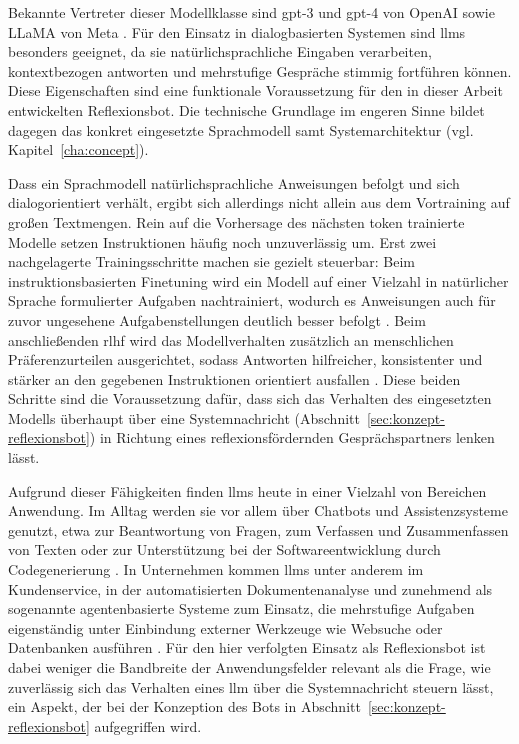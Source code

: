 Bekannte Vertreter dieser Modellklasse sind \acrshort{gpt}-3 und \acrshort{gpt}-4 von OpenAI sowie LLaMA von Meta \cite{zhaoSurveyLargeLanguageModels2023}.
Für den Einsatz in dialogbasierten Systemen sind \glspl{llm} besonders geeignet, da sie natürlichsprachliche Eingaben
verarbeiten, kontextbezogen antworten und mehrstufige Gespräche stimmig fortführen können.
Diese Eigenschaften sind eine funktionale Voraussetzung für den in dieser Arbeit entwickelten
Reflexionsbot. Die technische Grundlage im engeren Sinne bildet dagegen das konkret eingesetzte Sprachmodell
samt Systemarchitektur (vgl. Kapitel~\ref{cha:concept}).

Dass ein Sprachmodell natürlichsprachliche Anweisungen befolgt und sich dialogorientiert verhält,
ergibt sich allerdings nicht allein aus dem Vortraining auf großen Textmengen. Rein auf die Vorhersage
des nächsten \acrshort{token} trainierte Modelle setzen Instruktionen häufig noch unzuverlässig um.
Erst zwei nachgelagerte Trainingsschritte machen sie gezielt steuerbar: Beim instruktionsbasierten
Finetuning wird ein Modell auf einer Vielzahl in natürlicher Sprache formulierter Aufgaben
nachtrainiert, wodurch es Anweisungen auch für zuvor ungesehene Aufgabenstellungen deutlich besser
befolgt \cite{weiFinetunedLanguageModels2022}. Beim anschließenden \acrfull{rlhf} wird das
Modellverhalten zusätzlich an menschlichen Präferenzurteilen ausgerichtet, sodass Antworten
hilfreicher, konsistenter und stärker an den gegebenen Instruktionen orientiert ausfallen
\cite{ouyangTrainingLanguageModels2022}. Diese beiden Schritte sind die Voraussetzung dafür, dass sich
das Verhalten des eingesetzten Modells überhaupt über eine Systemnachricht
(Abschnitt~\ref{sec:konzept-reflexionsbot}) in Richtung eines reflexionsfördernden Gesprächspartners
lenken lässt.

Aufgrund dieser Fähigkeiten finden \glspl{llm} heute in einer Vielzahl von Bereichen Anwendung. Im Alltag werden sie vor allem über Chatbots
und Assistenzsysteme genutzt, etwa zur Beantwortung von Fragen, zum Verfassen und Zusammenfassen von Texten oder zur Unterstützung bei der Softwareentwicklung durch Codegenerierung \cite{zhaoSurveyLargeLanguageModels2023, garciaSystematicMappingStudy2025}. In Unternehmen kommen \glspl{llm}
unter anderem im Kundenservice, in der automatisierten Dokumentenanalyse und zunehmend als sogenannte agentenbasierte Systeme zum Einsatz, die mehrstufige
Aufgaben eigenständig unter Einbindung externer Werkzeuge wie Websuche oder Datenbanken ausführen \cite{yehudaiSurveyEvaluationLLMbased2025}.
Für den hier verfolgten Einsatz als Reflexionsbot ist dabei weniger die Bandbreite der Anwendungsfelder
relevant als die Frage, wie zuverlässig sich das Verhalten eines \gls{llm} über die Systemnachricht
steuern lässt, ein Aspekt, der bei der Konzeption des Bots in Abschnitt~\ref{sec:konzept-reflexionsbot}
aufgegriffen wird.

